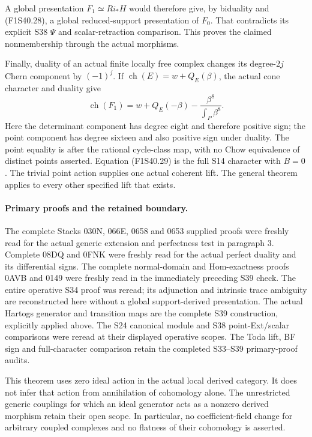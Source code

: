 A global presentation $F_1\simeq Ri_*H$
would therefore give, by biduality and
(F1S40.28), a global reduced-support
presentation of $F_0$. That contradicts its
explicit S38 $\Psi$ and scalar-retraction
comparison. This proves the claimed
nonmembership through the actual morphisms.

Finally, duality of an actual finite locally
free complex changes its degree-$2j$ Chern
component by $(-1)^j$. If
$\operatorname{ch}(E)=w+Q_E(\beta)$, the
actual cone character and duality give
\[
      \operatorname{ch}(F_1)
           =w+Q_E(-\beta)
                          -\frac{\beta^8}{\int_P\beta^8}.
 \tag{F1S40.29}
\]
Here the determinant component has degree
eight and therefore positive sign; the
point component has degree sixteen and
also positive sign under duality.
The point equality is after the rational
cycle-class map, with no Chow equivalence
of distinct points asserted. Equation
(F1S40.29) is the full S14 character with
$B=0$. The trivial point action supplies
one actual coherent lift. The general
theorem applies to every other specified
lift that exists.

\paragraph{Primary proofs and the retained boundary.}
The complete Stacks 030N, 066E, 0658 and 0653
supplied proofs were freshly read for the
actual generic extension and perfectness
test in paragraph 3. Complete 08DQ and
0FNK were freshly read for the actual
perfect duality and its differential signs.
The complete normal-domain and Hom-exactness
proofs 0AVB and 0149 were freshly read in
the immediately preceding S39 check.
The entire operative S34 proof was reread;
its adjunction and intrinsic trace ambiguity
are reconstructed here without a global
support-derived presentation. The actual
Hartogs generator and transition maps are
the complete S39 construction, explicitly
applied above. The S24 canonical module
and S38 point-Ext/scalar comparisons were
reread at their displayed operative scopes.
The Toda lift, BF sign and full-character
comparison retain the completed S33--S39
primary-proof audits.

This theorem uses zero ideal action in the
actual local derived category. It does not
infer that action from annihilation of
cohomology alone. The unrestricted generic
couplings for which an ideal generator acts
as a nonzero derived morphism retain their
open scope. In particular, no coefficient-field
change for arbitrary coupled complexes and
no flatness of their cohomology is asserted.
